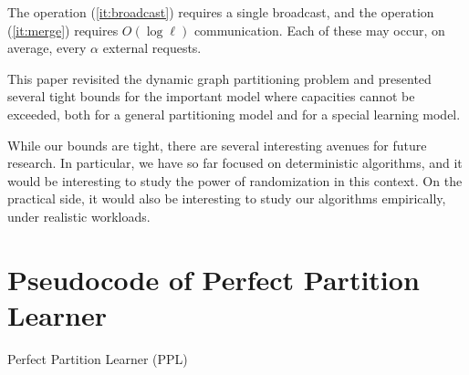 \documentclass[a4paper,anonymous,USenglish]{lipics-v2019}
\newcommand{\PPL}{\textsc{PPL}\xspace}
\DeclarePairedDelimiter\set{\{}{\}}
\begin{document}
The operation (\ref{it:broadcast}) requires a single broadcast, and the operation (\ref{it:merge}) requires $O(\log \ell)$ communication.
Each of these may occur, on average, every $\alpha$ external requests.

\medskip

This paper revisited the dynamic graph partitioning problem and presented several tight bounds for the important model where capacities cannot be exceeded, both for a general partitioning model and for a special learning model. 

While our bounds are tight, there are several interesting avenues for future research.
In particular, we have so far focused on deterministic algorithms, and it would be interesting to study the power of randomization in this context.
On the practical side, it would also be interesting to study our algorithms empirically, under realistic workloads.




\appendix

\section{Pseudocode of Perfect Partition Learner}

\begin{algorithm}
	\renewcommand{\algorithmicrequire}{\textbf{Input:}}
	\renewcommand{\algorithmicensure}{\textbf{Output:}}
	\begin{algorithmic}
		\label{line:initcomponents}
		 \label{line:mergecomponents}
		\label{line:rebalance} 
		\ENDIF
		\ENDIF
		\ENDFOR
	\end{algorithmic}
	\caption{Perfect Partition Learner (\PPL)}
	\label{alg:ppl}
\end{algorithm}
\end{document}
